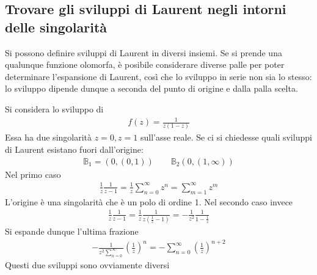 \documentclass[a4paper, oneside]{article}
\begin{document}
\subsection{Trovare gli sviluppi di Laurent negli intorni delle singolarità}
Si possono definire sviluppi di Laurent in diversi insiemi. Se si prende una qualunque
funzione olomorfa, è posibile considerare diverse palle per poter determinare 
l'espansione di Laurent, così che lo sviluppo in serie non sia lo stesso:
lo sviluppo dipende dunque a seconda del punto di origine e dalla palla scelta.
\begin{example}
    Si considera lo sviluppo di 
    \begin{gather*}
        f(z) = \frac{1}{z(1 - z)}
    \end{gather*}
    Essa ha due singolarità $z = 0, z = 1$ sull'asse reale. Se ci si chiedesse 
    quali sviluppi di Laurent esistano fuori dall'origine:
    \begin{gather*}
        \mathbb{B}_1 = (0, (0, 1)) \qquad \mathbb{B}_2(0, (1, \infty ))
    \end{gather*}
    Nel primo caso 
    \begin{gather*}
        \frac{1}{z}\frac{1}{z - 1} = \frac{1}{z} \sum_{n = 0}^{\infty } z^{n} = \sum_{m = 1}^{\infty } z^{m}  
    \end{gather*}
    L'origine è una singolarità che è un polo di ordine 1. Nel secondo caso invece
    \begin{gather*}
        \frac{1}{z} \frac{1}{z - 1} = \frac{1}{z} \frac{1}{z\left(\frac{1}{z} - 1\right)} = -\frac{1}{z^{2}} \frac{1}{1 - \frac{1}{z}}
    \end{gather*}
    Si espande dunque l'ultima frazione 
    \begin{gather*}
        - \frac{1}{z^{2} \sum_{n = 0}^{\infty } } \left(\frac{1}{z}\right)^{n} = -\sum_{n = 0}^{\infty } \left(\frac{1}{z}\right) ^{n + 2}
    \end{gather*}
    Questi due sviluppi sono ovviamente diversi
\end{example}
\end{document}
